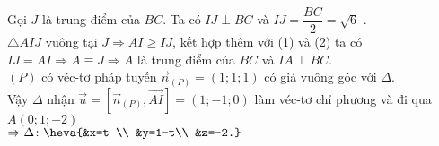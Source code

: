 \begin{ex}
{		Gọi $J$ là trung điểm của $BC$. Ta có $I J \perp BC$ và $I J=\dfrac{BC}{2}=\sqrt{6}$ .\\		
		$\triangle AIJ$ vuông tại $J\Rightarrow AI\geq IJ$, kết hợp thêm với (1) và (2) ta có $IJ=AI\Rightarrow A\equiv J\Rightarrow A$ là trung điểm của $BC$ và $I A \perp BC$.\\
		$(P)$ có véc-tơ  pháp tuyến $\vec{n}_{(P)}=(1; 1; 1)$ có giá vuông góc với $\Delta$.\\
		Vậy $\Delta$ nhận $\vec{u}=\left[\vec{n}_{(P)}, \overrightarrow{AI}\right]=(1;-1; 0)$ làm véc-tơ  chỉ phương và đi qua $A(0; 1;-2)$\\
		$\Rightarrow \Delta\colon \heva{&x=t \\
			&y=1-t\\
			&z=-2.}$
	}
\end{ex}


